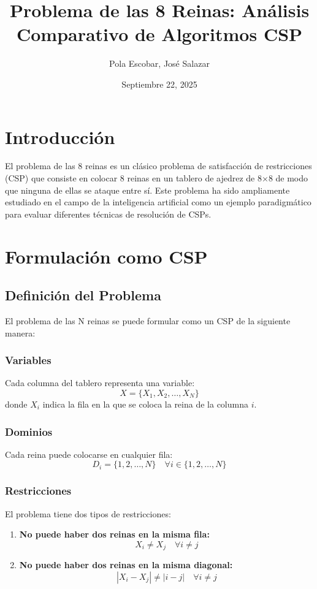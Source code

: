 \documentclass[12pt,a4paper]{article}
\title{\textbf{Problema de las 8 Reinas: Análisis Comparativo de Algoritmos CSP}}
\author{Pola Escobar, José Salazar}
\date{Septiembre 22, 2025}
\begin{document}
\maketitle

\section{Introducción}

El problema de las 8 reinas es un clásico problema de satisfacción de restricciones (CSP) que consiste en colocar 8 reinas en un tablero de ajedrez de 8×8 de modo que ninguna de ellas se ataque entre sí. Este problema ha sido ampliamente estudiado en el campo de la inteligencia artificial como un ejemplo paradigmático para evaluar diferentes técnicas de resolución de CSPs.

\section{Formulación como CSP}

\subsection{Definición del Problema}

El problema de las N reinas se puede formular como un CSP de la siguiente manera:

\subsubsection{Variables}
Cada columna del tablero representa una variable:
$$X = \{X_1, X_2, \ldots, X_N\}$$
donde $X_i$ indica la fila en la que se coloca la reina de la columna $i$.

\subsubsection{Dominios}
Cada reina puede colocarse en cualquier fila:
$$D_i = \{1, 2, \ldots, N\} \quad \forall i \in \{1, 2, \ldots, N\}$$

\subsubsection{Restricciones}
El problema tiene dos tipos de restricciones:

\begin{enumerate}[label=\arabic*.]
    \item \textbf{No puede haber dos reinas en la misma fila:}
    $$X_i \neq X_j \quad \forall i \neq j$$
    
    \item \textbf{No puede haber dos reinas en la misma diagonal:}
    $$|X_i - X_j| \neq |i - j| \quad \forall i \neq j$$
\end{enumerate}
\end{document}
